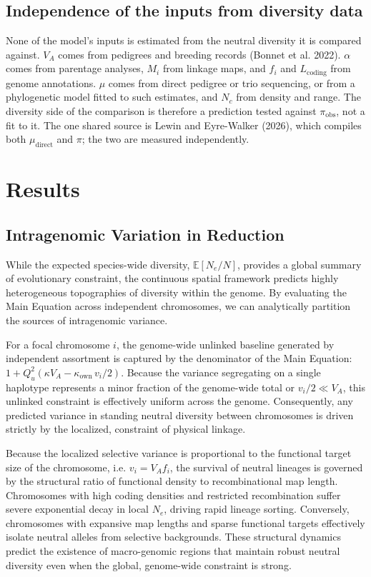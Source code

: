 \documentclass[12pt]{article}
\begin{document}
\subsection{Independence of the inputs from diversity data}
None of the model's inputs is estimated from the neutral diversity it is compared against. $V_A$ comes from pedigrees and breeding records (Bonnet et al. 2022). $\alpha$ comes from parentage analyses, $M_i$ from linkage maps, and $f_i$ and $L_\text{coding}$ from genome annotations. $\mu$ comes from direct pedigree or trio sequencing, or from a phylogenetic model fitted to such estimates, and $N_c$ from density and range. The diversity side of the comparison is therefore a prediction tested against $\pi_\text{obs}$, not a fit to it. The one shared source is Lewin and Eyre-Walker (2026), which compiles both $\mu_\text{direct}$ and $\pi$; the two are measured independently.

\section{Results}



\subsection{Intragenomic Variation in Reduction}
While the expected species-wide diversity, $\mathbb{E}[N_e/N]$, provides a global summary of evolutionary constraint, the continuous spatial framework predicts highly heterogeneous topographies of diversity within the genome. By evaluating the Main Equation across independent chromosomes, we can analytically partition the sources of intragenomic variance.

For a focal chromosome $i$, the genome-wide unlinked baseline generated by independent assortment is captured by the denominator of the Main Equation: $1 + Q_u^2(\kappa V_A - \kappa_\text{own}\,v_i/2)$. Because the variance segregating on a single haplotype represents a minor fraction of the genome-wide total or $v_i/2 \ll V_A$, this unlinked constraint is effectively uniform across the genome. Consequently, any predicted variance in standing neutral diversity between chromosomes is driven strictly by the localized, constraint of physical linkage.

Because the localized selective variance is proportional to the functional target size of the chromosome, i.e. $v_i = V_A f_i$, the survival of neutral lineages is governed by the structural ratio of functional density to recombinational map length. Chromosomes with high coding densities and restricted recombination suffer severe exponential decay in local $N_e$, driving rapid lineage sorting. Conversely, chromosomes with expansive map lengths and sparse functional targets effectively isolate neutral alleles from selective backgrounds. These structural dynamics predict the existence of macro-genomic regions that maintain robust neutral diversity even when the global, genome-wide constraint is strong.
\end{document}
